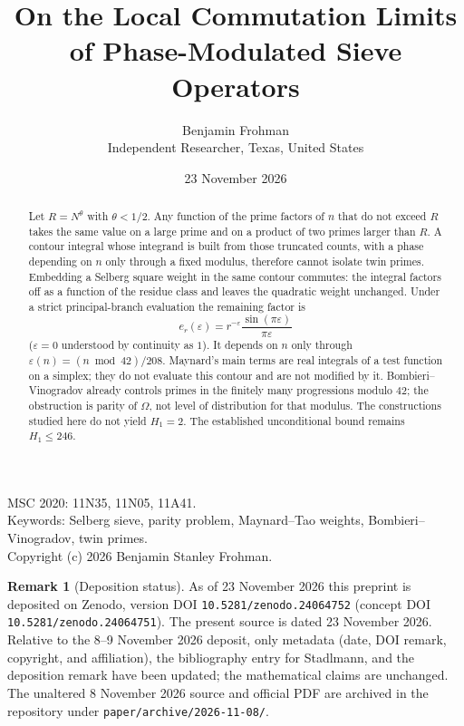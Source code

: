 \documentclass[11pt,a4paper]{article}
\title{On the Local Commutation Limits\\ of Phase-Modulated Sieve Operators}
\author{Benjamin Frohman\\
Independent Researcher, Texas, United States}
\date{23 November 2026}
\theoremstyle{plain}
\theoremstyle{definition}
\newtheorem{remark}{Remark}
\theoremstyle{plain}
\numberwithin{equation}{section}
\begin{document}
\maketitle

\begin{abstract}
Let \(R=N^{\theta}\) with \(\theta<1/2\). Any function of the prime factors of \(n\) that do not exceed \(R\) takes the same value on a large prime and on a product of two primes larger than \(R\). A contour integral whose integrand is built from those truncated counts, with a phase depending on \(n\) only through a fixed modulus, therefore cannot isolate twin primes. Embedding a Selberg square weight in the same contour commutes: the integral factors off as a function of the residue class and leaves the quadratic weight unchanged. Under a strict principal-branch evaluation the remaining factor is
\[
e_r(\varepsilon)=r^{-\varepsilon}\frac{\sin(\pi\varepsilon)}{\pi\varepsilon}
\]
(\(\varepsilon=0\) understood by continuity as \(1\)). It depends on \(n\) only through \(\varepsilon(n)=(n\bmod 42)/208\). Maynard's main terms are real integrals of a test function on a simplex; they do not evaluate this contour and are not modified by it. Bombieri--Vinogradov already controls primes in the finitely many progressions modulo \(42\); the obstruction is parity of \(\Omega\), not level of distribution for that modulus. The constructions studied here do not yield \(H_1=2\). The established unconditional bound remains \(H_1\le 246\).
\end{abstract}

\noindent
MSC 2020: 11N35, 11N05, 11A41.\\
Keywords: Selberg sieve, parity problem, Maynard--Tao weights, Bombieri--Vinogradov, twin primes.\\
Copyright (c) 2026 Benjamin Stanley Frohman.


\begin{remark}[Deposition status]
As of 23 November 2026 this preprint is deposited on Zenodo, version DOI \texttt{10.5281/zenodo.24064752} (concept DOI \texttt{10.5281/zenodo.24064751}). The present source is dated 23 November 2026. Relative to the 8--9 November 2026 deposit, only metadata (date, DOI remark, copyright, and affiliation), the bibliography entry for Stadlmann, and the deposition remark have been updated; the mathematical claims are unchanged. The unaltered 8 November 2026 source and official PDF are archived in the repository under \texttt{paper/archive/2026-11-08/}.
\end{remark}
\end{document}
